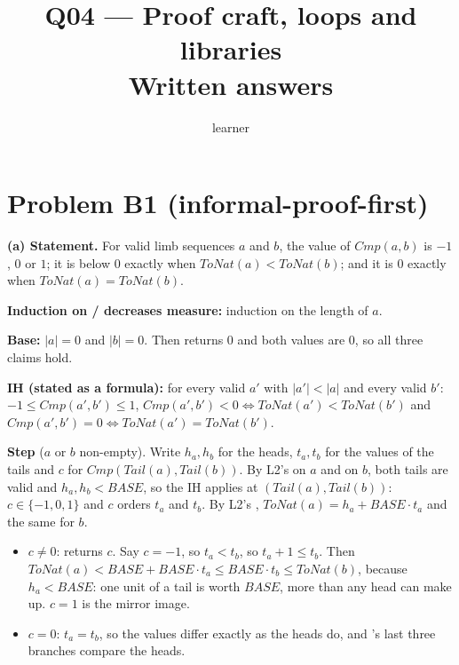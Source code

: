\documentclass[11pt]{article}
\title{Q04 --- Proof craft, loops and libraries \\ \large Written answers}
\author{learner}
\date{}
\begin{document}
\maketitle

\section*{Problem B1 (informal-proof-first)}\label{ans:B1}
\begin{answer}
\textbf{(a) Statement.} For valid limb sequences $a$ and $b$, the value of
$\mathit{Cmp}(a, b)$ is $-1$, $0$ or $1$; it is below $0$ exactly when
$\mathit{ToNat}(a) < \mathit{ToNat}(b)$; and it is $0$ exactly when
$\mathit{ToNat}(a) = \mathit{ToNat}(b)$.

\textbf{Induction on / decreases measure:} induction on the length of $a$.

\textbf{Base:} $|a| = 0$ and $|b| = 0$. Then  returns 0 and both
values are 0, so all three claims hold.

\textbf{IH (stated as a formula):} for every valid $a'$ with $|a'| < |a|$ and
every valid $b'$: $-1 \leq \mathit{Cmp}(a', b') \leq 1$,
$\mathit{Cmp}(a', b') < 0 \iff \mathit{ToNat}(a') < \mathit{ToNat}(b')$ and
$\mathit{Cmp}(a', b') = 0 \iff \mathit{ToNat}(a') = \mathit{ToNat}(b')$.

\textbf{Step} ($a$ or $b$ non-empty). Write $h_a, h_b$ for the heads,
$t_a, t_b$ for the values of the tails and $c$ for
$\mathit{Cmp}(\mathit{Tail}(a), \mathit{Tail}(b))$. By L2's  on
$a$ and on $b$, both tails are valid and $h_a, h_b < \mathit{BASE}$, so the IH
applies at $(\mathit{Tail}(a), \mathit{Tail}(b))$: $c \in \{-1, 0, 1\}$ and $c$
orders $t_a$ and $t_b$. By L2's ,
$\mathit{ToNat}(a) = h_a + \mathit{BASE} \cdot t_a$ and the same for $b$.
\begin{itemize}
\item $c \neq 0$:  returns $c$. Say $c = -1$, so $t_a < t_b$, so
  $t_a + 1 \leq t_b$. Then $\mathit{ToNat}(a) < \mathit{BASE} + \mathit{BASE}
  \cdot t_a \leq \mathit{BASE} \cdot t_b \leq \mathit{ToNat}(b)$, because
  $h_a < \mathit{BASE}$: one unit of a tail is worth $\mathit{BASE}$, more than
  any head can make up. $c = 1$ is the mirror image.
\item $c = 0$: $t_a = t_b$, so the values differ exactly as the heads do, and
  's last three branches compare the heads.
\end{itemize}


\end{answer}
\end{document}
